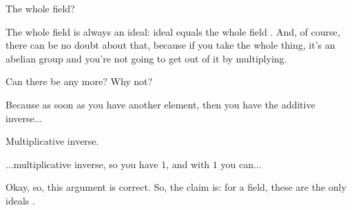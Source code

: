 \begin{student}
The whole field?
\end{student}

\begin{speech}[00:40:07 - 00:40:21]
The whole field is always an ideal: ideal equals the whole field . And, of course, there can be no doubt about that, because if you take the whole thing, it's an abelian group and you're not going to get out of it by multiplying.

Can there be any more? Why not?
\end{speech}

\begin{student}
Because as soon as you have another element, then you have the additive inverse...
\end{student}

\begin{speech}[00:40:26 - 00:40:28]
Multiplicative inverse.
\end{speech}

\begin{student}
...multiplicative inverse, so you have $1$, and with $1$ you can...
\end{student}

\begin{speech}[00:40:30 - 00:40:37]
Okay, so, this argument is correct. So, the claim is: for a field, these are the only ideals .
\end{speech}

